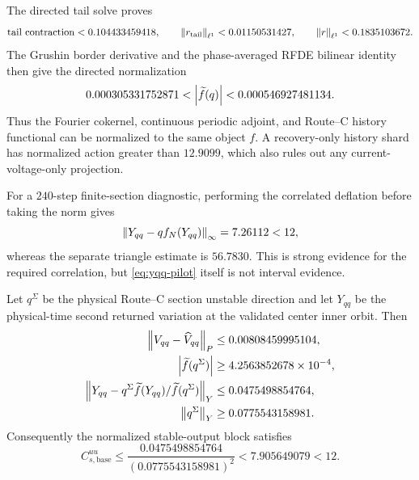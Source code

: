 The directed tail solve proves
\begin{equation}
 \text{tail contraction}<0.104433459418,\qquad
 \left\lVert r_{\rm tail}\right\rVert_{\ell^1}<0.01150531427,\qquad
 \left\lVert r\right\rVert_{\ell^1}<0.1835103672.                        \label{eq:adjoint-tail}
\end{equation}
The Grushin border derivative and the phase-averaged RFDE bilinear identity
then give the directed normalization
\begin{equation}
 0.000305331752871<\left\lvert\widetilde f(q)\right\rvert
 <0.000546927481134.                                   \label{eq:fq-bound}
\end{equation}
Thus the Fourier cokernel, continuous periodic adjoint, and Route--C
history functional can be normalized to the same object \(f\).  A recovery-only
history shard has normalized action greater than \(12.9099\), which also
rules out any current-voltage-only projection.

For a \(240\)-step finite-section diagnostic, performing the correlated
deflation before taking the norm gives
\begin{equation}
 \left\lVert Y_{qq}-qf_N(Y_{qq})\right\rVert_\infty=7.26112<12,          \label{eq:yqq-pilot}
\end{equation}
whereas the separate triangle estimate is \(56.7830\).  This is strong
evidence for the required correlation, but \cref{eq:yqq-pilot} itself is
not interval evidence.

\begin{proposition}\label{prop:base-uu}
Let \(q^\Sigma\) be the physical Route--C section unstable direction and
let \(Y_{qq}\) be the physical-time second returned variation at the
validated center inner orbit.  Then
\begin{align}
 \left\lVert V_{qq}-\widehat V_{qq}\right\rVert_P
   &\le0.00808459995104,\notag\\
 \left\lvert\widetilde f(q^\Sigma)\right\rvert
   &\ge4.2563852678\times10^{-4},\notag\\
 \left\lVert Y_{qq}-q^\Sigma
       \widetilde f(Y_{qq})/\widetilde f(q^\Sigma)\right\rVert_Y
   &\le0.0475498854764,\notag\\
 \left\lVert q^\Sigma\right\rVert_Y&\ge0.0775543158981.                 \label{eq:directed-base-uu}
\end{align}
Consequently the normalized stable-output block satisfies
\begin{equation}
 C^{uu}_{s,\mathrm{base}}
 \le\frac{0.0475498854764}{(0.0775543158981)^2}
 <7.905649079<12.                                     \label{eq:base-uu-bound}
\end{equation}
\end{proposition}

